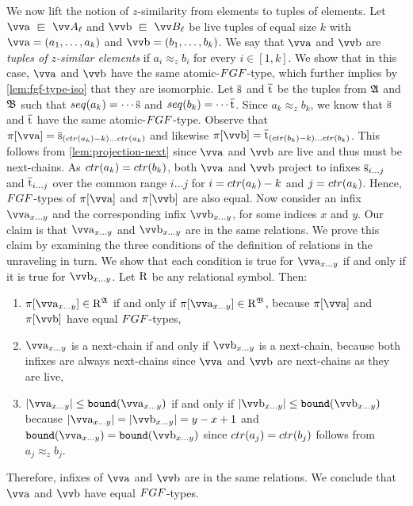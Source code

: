 We now lift the notion of $z$-similarity from elements to tuples of elements.
Let $\elemtuptuplea \sqin \unraveldom{A}_{\ell}$ and $\elemtuptupleb \sqin \unraveldom{B}_{\ell}$ be live tuples of equal size $k$ with $\elemtuptuplea = (a_{1}, \ldots, a_{k})$ and $\elemtuptupleb = (b_{1}, \ldots, b_{k})$.
We say that $\elemtuptuplea$ and $\elemtuptupleb$ are \emph{tuples of $z$-similar elements} if $a_{i} \approx_{z} b_{i}$ for every $i \in [1,k]$.
We show that in this case, $\elemtuptuplea$ and $\elemtuptupleb$ have the same atomic-$\FGF$-type, which further implies by \cref{lem:fgf-type-iso} that they are isomorphic.
Let $\overline{\mathrm{s}}$ and $\overline{\mathrm{t}}$ be the tuples from ${\mathfrak{A}}$ and ${\mathfrak{B}}$ such that $\seq{a_{k}} = \cdots \elemtuples$ and $\seq{b_{k}} = \cdots \elemtuplet$.
Since $a_{k} \approx_z b_{k}$, we know that $\overline{\mathrm{s}}$ and $\overline{\mathrm{t}}$ have the same atomic-$\FGF$-type.
Observe that $\pi[\elemtuptuplea] = \elemtuples_{(\ctr{a_{k}}-k)\ldots{}\ctr{a_{k}}}$ and likewise $\pi[\elemtuptupleb] = \elemtuplet_{(\ctr{b_{k}}-k)\ldots{}\ctr{b_{k}}}$.
This follows from \cref{lem:projection-next} since $\elemtuptuplea$ and $\elemtuptupleb$ are live and thus must be next-chains.
As $\ctr{a_{k}} = \ctr{b_{k}}$, both $\elemtuptuplea$ and $\elemtuptupleb$ project to infixes $\overline{\mathrm{s}}_{i\ldots{}j}$ and $\overline{\mathrm{t}}_{i\ldots{}j}$ over the common range $i\ldots{}j$ for $i = \ctr{a_{k}} - k$ and $j = \ctr{a_{k}}$.
Hence, $\FGF$-types of $\pi[\elemtuptuplea]$ and $\pi[\elemtuptupleb]$ are also equal.
Now consider an infix $\elemtuptuplea_{x\ldots{}y}$ and the corresponding infix $\elemtuptupleb_{x\ldots{}y}$, for some indices $x$ and $y$.
Our claim is that $\elemtuptuplea_{x\ldots{}y}$ and $\elemtuptupleb_{x\ldots{}y}$ are in the same relations.
We prove this claim by examining the three conditions of the definition of relations in the unraveling in turn.
We show that each condition is true for $\elemtuptuplea_{x\ldots{}y}$ if and only if it is true for $\elemtuptupleb_{x\ldots{}y}$.
Let $\mathrm{R}$ be any relational symbol. Then:
\begin{enumerate}
  \item $\pi[\elemtuptuplea_{x\ldots{}y}] \in \relR^{\str{A}}$ if and only if $\pi[\elemtuptuplea_{x\ldots{}y}] \in \relR^{\str{B}}$, because $\pi[\elemtuptuplea]$ and $\pi[\elemtuptupleb]$ have equal $\FGF$-types,
  \item $\elemtuptuplea_{x\ldots{}y}$ is a next-chain if and only if $\elemtuptupleb_{x\ldots{}y}$ is a next-chain, because both infixes are always next-chains since $\elemtuptuplea$ and $\elemtuptupleb$ are next-chains as they are live,
  \item $|\elemtuptuplea_{x\ldots{}y}| \le \mathtt{bound}(\elemtuptuplea_{x\ldots{}y})$ if and only if $|\elemtuptupleb_{x\ldots{}y}| \le \mathtt{bound}(\elemtuptupleb_{x\ldots{}y})$ because $|\elemtuptuplea_{x\ldots{}y}| = |\elemtuptupleb_{x\ldots{}y}| = y-x+1$ and $\mathtt{bound}(\elemtuptuplea_{x\ldots{}y}) = \mathtt{bound}(\elemtuptupleb_{x\ldots{}y})$ since $\ctr{a_{j}} = \ctr{b_{j}}$ follows from $a_{j} \approx_{z} b_{j}$.
\end{enumerate}
Therefore, infixes of $\elemtuptuplea$ and $\elemtuptupleb$ are in the same relations.
We conclude that $\elemtuptuplea$ and $\elemtuptupleb$ have equal $\FGF$-types.

